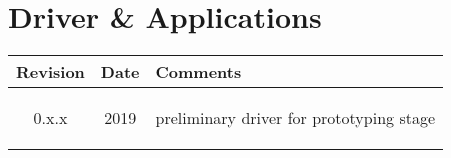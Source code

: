 \section{Driver \& Applications}
\begin{tabularx}{\textwidth}{|c|c|X|}
    \hline
    Revision & Date & Comments\\
    \hline\hline
    \hypertarget{drvrev}{0.x.x} & 2019 & preliminary driver for prototyping stage\\
    \hline
 
\end{tabularx}
